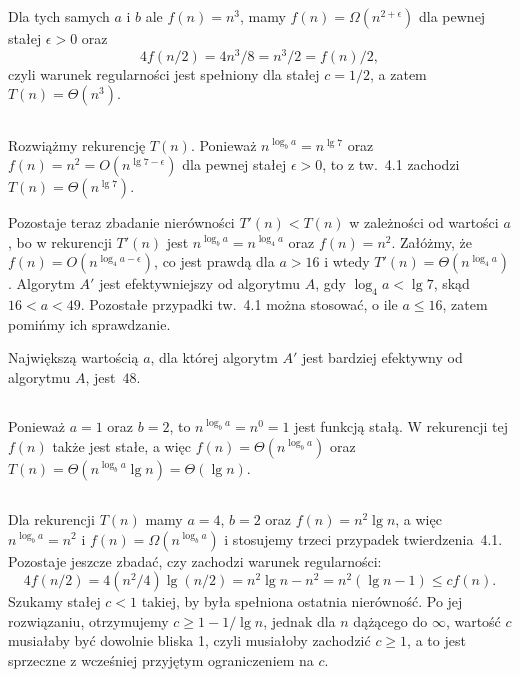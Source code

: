 \subsubsection{}
Dla tych samych $a$ i $b$ ale $f(n)=n^3$, mamy $f(n)=\Omega(n^{2+\epsilon})$ dla pewnej stałej $\epsilon>0$ oraz
\[
	4f(n/2) = 4n^3\!/8 = n^3\!/2 = f(n)/2,
\]
czyli warunek regularności jest spełniony dla stałej $c=1/2$, a zatem $T(n)=\Theta(n^3)$.

\subsection{} %
Rozwiążmy rekurencję $T(n)$. Ponieważ $n^{\log_ba}=n^{\lg7}$ oraz $f(n)=n^2=O(n^{\lg7-\epsilon})$ dla pewnej stałej $\epsilon>0$, to z tw.~4.1 zachodzi $T(n)=\Theta(n^{\lg7})$.

Pozostaje teraz zbadanie nierówności $T'(n)<T(n)$ w zależności od wartości $a$, bo w rekurencji $T'(n)$ jest $n^{\log_ba}=n^{\log_4a}$ oraz $f(n)=n^2$. Załóżmy, że $f(n)=O(n^{\log_4a-\epsilon})$, co jest prawdą dla $a>16$ i wtedy $T'(n)=\Theta(n^{\log_4a})$. Algorytm $A'$ jest efektywniejszy od algorytmu $A$, gdy $\log_4a<\lg7$, skąd $16<a<49$. Pozostałe przypadki tw.~4.1 można stosować, o ile $a\le16$, zatem pomińmy ich sprawdzanie.

Największą wartością $a$, dla której algorytm $A'$ jest bardziej efektywny od algorytmu $A$, jest~$48$.

\subsection{} %
Ponieważ $a=1$ oraz $b=2$, to $n^{\log_ba}=n^0=1$ jest funkcją stałą. W rekurencji tej $f(n)$ także jest stałe, a więc $f(n)=\Theta(n^{\log_ba})$ oraz $T(n)=\Theta(n^{\log_ba}\lg n)=\Theta(\lg n)$.

\subsection{} %
Dla rekurencji $T(n)$ mamy $a=4$, $b=2$ oraz $f(n)=n^2\lg n$, a więc $n^{\log_ba}=n^2$ i $f(n)=\Omega(n^{\log_ba})$ i stosujemy trzeci przypadek twierdzenia~4.1. Pozostaje jeszcze zbadać, czy zachodzi warunek regularności:
\[
	4f(n/2) = 4(n^2\!/4)\lg(n/2) = n^2\lg n-n^2 = n^2(\lg n-1) \le cf(n).
\]
Szukamy stałej $c<1$ takiej, by była spełniona ostatnia nierówność. Po jej rozwiązaniu, otrzymujemy $c\ge1-1/\!\lg n$, jednak dla $n$ dążącego do $\infty$, wartość $c$ musiałaby być dowolnie bliska 1, czyli musiałoby zachodzić $c\ge1$, a to jest sprzeczne z wcześniej przyjętym ograniczeniem na $c$.

